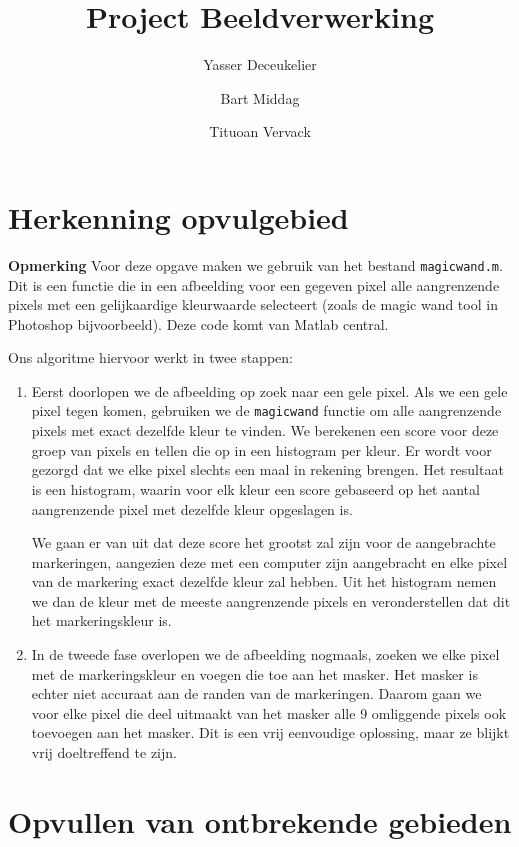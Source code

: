 \documentclass[titlepage]{article}
\title{Project Beeldverwerking}
\author{Yasser {Deceukelier} \and Bart {Middag} \and Tituoan {Vervack} }
\date{}
\newenvironment{note}{\textbf{Opmerking}}{}
\begin{document}
\maketitle

\section{Herkenning opvulgebied}

\begin{note}
Voor deze opgave maken we gebruik van het bestand \texttt{magicwand.m}. Dit is een functie die in een afbeelding voor een gegeven pixel alle aangrenzende pixels met een gelijkaardige kleurwaarde selecteert (zoals de magic wand tool in Photoshop bijvoorbeeld). Deze code komt van Matlab central.
\end{note}

Ons algoritme hiervoor werkt in twee stappen:
\begin{enumerate}
\item 
Eerst doorlopen we de afbeelding op zoek naar een gele pixel. Als we een gele pixel tegen komen, gebruiken we de \verb!magicwand! functie om alle aangrenzende pixels met exact dezelfde kleur te vinden. We berekenen een score voor deze groep van pixels en tellen die op in een histogram per kleur. Er wordt voor gezorgd dat we elke pixel slechts een maal in rekening brengen. Het resultaat is een histogram, waarin voor elk kleur een score gebaseerd op het aantal aangrenzende pixel met dezelfde kleur opgeslagen is. 
\par
We gaan er van uit dat deze score het grootst zal zijn voor de aangebrachte markeringen, aangezien deze met een computer zijn aangebracht en elke pixel van de markering exact dezelfde kleur zal hebben. Uit het histogram nemen we dan de kleur met de meeste aangrenzende pixels en veronderstellen dat dit het markeringskleur is.
\item
In de tweede fase overlopen we de afbeelding nogmaals, zoeken we elke pixel met de markeringskleur en voegen die toe aan het masker. Het masker is echter niet accuraat aan de randen van de markeringen. Daarom gaan we voor elke pixel die deel uitmaakt van het masker alle 9 omliggende pixels ook toevoegen aan het masker. Dit is een vrij eenvoudige oplossing, maar ze blijkt vrij doeltreffend te zijn.
\end{enumerate}

\section{Opvullen van ontbrekende gebieden}
\end{document}
